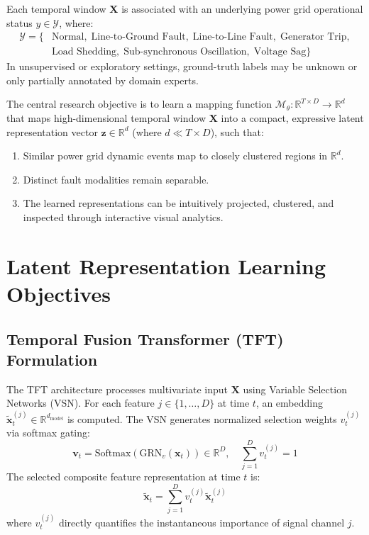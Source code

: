 \documentclass[12pt,a4paper]{report}
\begin{document}
Each temporal window $\mathbf{X}$ is associated with an underlying power grid operational status $y \in \mathcal{Y}$, where:
\begin{align}
    \mathcal{Y} = \{ & \text{Normal}, \; \text{Line-to-Ground Fault}, \; \text{Line-to-Line Fault}, \; \text{Generator Trip}, \nonumber \\
                     & \text{Load Shedding}, \; \text{Sub-synchronous Oscillation}, \; \text{Voltage Sag} \}
\end{align}
In unsupervised or exploratory settings, ground-truth labels may be unknown or only partially annotated by domain experts.

The central research objective is to learn a mapping function $\mathcal{M}_\theta: \mathbb{R}^{T \times D} \to \mathbb{R}^d$ that maps high-dimensional temporal window $\mathbf{X}$ into a compact, expressive latent representation vector $\mathbf{z} \in \mathbb{R}^d$ (where $d \ll T \times D$), such that:
\begin{enumerate}
    \item Similar power grid dynamic events map to closely clustered regions in $\mathbb{R}^d$.
    \item Distinct fault modalities remain separable.
    \item The learned representations can be intuitively projected, clustered, and inspected through interactive visual analytics.
\end{enumerate}

\section{Latent Representation Learning Objectives}

\subsection{Temporal Fusion Transformer (TFT) Formulation}
The TFT architecture processes multivariate input $\mathbf{X}$ using Variable Selection Networks (VSN). For each feature $j \in \{1, \dots, D\}$ at time $t$, an embedding $\tilde{\mathbf{x}}_t^{(j)} \in \mathbb{R}^{d_{\text{model}}}$ is computed. The VSN generates normalized selection weights $v_t^{(j)}$ via softmax gating:
\begin{equation}
    \mathbf{v}_t = \text{Softmax}\left( \text{GRN}_v(\mathbf{x}_t) \right) \in \mathbb{R}^D, \quad \sum_{j=1}^D v_t^{(j)} = 1
\end{equation}
The selected composite feature representation at time $t$ is:
\begin{equation}
    \tilde{\mathbf{x}}_t = \sum_{j=1}^D v_t^{(j)} \tilde{\mathbf{x}}_t^{(j)}
\end{equation}
where $v_t^{(j)}$ directly quantifies the instantaneous importance of signal channel $j$.
\end{document}
